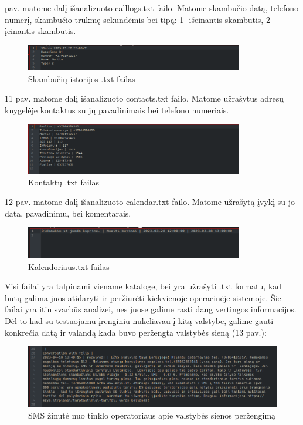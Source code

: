 \documentclass[a4paper,12pt,fleqn]{article}
\begin{document}
 pav. matome dalį išanalizuoto call\textunderscore logs.txt failo. Matome skambučio datą, telefono numerį, skambučio trukmę sekundėmis bei tipą: 1- išeinantis skambutis, 2 - įeinantis skambutis.
\begin{figure} [H]
    \centering
    \includegraphics[width=0.85\textwidth]{callog.png}
    
    \caption{Skambučių istorijos .txt failas}
    \label{fig:callog}
\end{figure}

11 pav. matome dalį išanalizuoto contacts.txt failo. Matome užrašytus adresų knygelėje kontaktus su jų pavadinimais bei telefono numeriais.
\begin{figure} [H]
    \centering
    \includegraphics[width=0.85\textwidth]{contacts.png}
    
    \caption{Kontaktų .txt failas}
    \label{fig:contacts}
\end{figure}

12 pav. matome dalį išanalizuoto calendar.txt failo. Matome užrašytą įvykį su jo data, pavadinimu, bei komentarais.
\begin{figure} [H]
    \centering
    \includegraphics[width=0.85\textwidth]{calendar.png}
    
    \caption{Kalendoriaus.txt failas}
    \label{fig:calendar}
\end{figure}

Visi failai yra talpinami viename kataloge, bei yra užrašyti .txt formatu, kad būtų galima juos atidaryti ir peržiūrėti kiekvienoje operacinėje sistemoje. Šie failai yra itin svarbūs analizei, nes juose galime rasti daug vertingos informacijos. Dėl to kad su testuojamu įrenginiu nukeliavau į kitą valstybe, galime gauti konkrečia datą ir valandą kada buvo peržengta valstybės sieną (13 pav.):
\begin{figure} [H]
    \centering
    \includegraphics[width=0.85\linewidth]{sms_country.png}
    \caption{SMS žinutė nuo tinklo operatoriaus apie valstybės sienos peržengimą}
    \label{fig:country-borders}
\end{figure}

\end{document}
